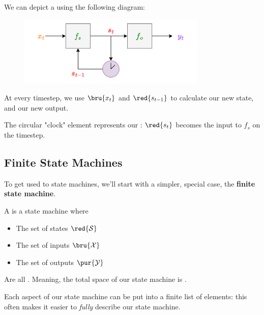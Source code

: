             \begin{notation}
                We can depict a  using the following diagram:
                
                \begin{figure}[H]
                    \centering
                    \includegraphics[width=90mm,scale=0.4]{images/rnn_images/state_machine_diagram.png}
                \end{figure}
                
                At every timestep, we use $\bru{x_t}$ and $\red{s_{t-1}}$ to calculate our new state, and our new output.
                
                The circular "clock" element represents our : $\red{s_t}$ becomes the input to $f_s$ on the  timestep.
            \end{notation}




    \pagebreak

    \subsection{Finite State Machines}

        To get used to state machines, we'll start with a simpler, special case, the \textbf{finite state machine}.\\
            
        \begin{definition}
            A  is a state machine where
            
            \begin{itemize}
                \item The set of states $\red{\mathcal{S}}$
                \item The set of inputs $\bru{\mathcal{X}}$
                \item The set of outputs $\pur{\mathcal{Y}}$
            \end{itemize}
            
            Are all . Meaning, the total space of our state machine is .
            
            Each aspect of our state machine can be put into a finite list of elements: this often makes it easier to \textit{fully} describe our state machine.
        \end{definition}
        
